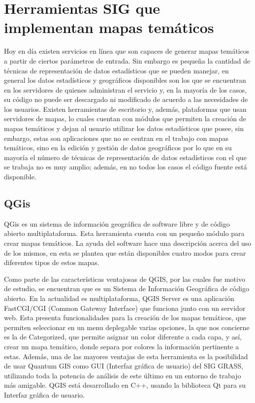 \section{Herramientas SIG que implementan mapas tem\'aticos}
Hoy en d\'ia existen servicios en l\'inea que son capaces de generar mapas tem\'aticos a partir de ciertos par\'ametros de entrada. Sin embargo es peque\~na la cantidad de t\'ecnicas de representaci\'on de datos estad\'isticos que se pueden manejar, en general los datos estad\'isticos y geogr\'aficos disponibles son los que se encuentran en los servidores de quienes administran el servicio y, en la mayor\'ia de los casos, su c\'odigo no puede ser descargado ni modificado de acuerdo a las necesidades de los usuarios. Existen herramientas de escritorio y, adem\'as, plataformas que usan servidores de mapas, lo cuales cuentan con m\'odulos que permiten la creaci\'on de mapas tem\'aticos y dejan al usuario utilizar los datos estad\'isticos que posee, sin embargo, estas son aplicaciones que no se centran en el trabajo con mapas tem\'aticos, sino en la edici\'on y gesti\'on de datos geogr\'aficos por lo que en su mayor\'ia el n\'umero de t\'ecnicas de representaci\'on de datos estad\'isticos con el que se trabaja no es muy amplio; adem\'as, en no todos los casos el c\'odigo fuente est\'a disponible.


\subsection{QGis}
QGis es un sistema de informaci\'on geogr\'afica de software libre y de c\'odigo abierto multiplataforma. Esta herramienta cuenta con un peque\~no m\'odulo para crear mapas tem\'aticos. La ayuda del software hace una descripci\'on acerca del uso de los mismos, en esta se plantea que est\'an disponibles cuatro modos para crear diferentes tipos de estos mapas. 

Como parte de las caracter\'isticas ventajosas de QGIS, por las cuales fue motivo de estudio, se encuentran que es un Sistema de Informaci\'on Geogr\'afica de c\'odigo abierto. En la actualidad es multiplataforma, QGIS Server es una aplicaci\'on FastCGI/CGI (Common Gateway Interface) que funciona junto con un servidor web. Esta presenta funcionalidades para la creaci\'on de los mapas tem\'aticos, que permiten seleccionar en un menu deplegable varias opciones, la que nos concierne es la de Categorized, que permite asignar un color diferente a cada capa, y as\'i, crear un mapa tem\'atico, donde separa por colores la informaci\'on pertinente a estas. Adem\'as, una de las mayores ventajas de esta herramienta es la posibilidad de usar Quantum GIS como GUI (Interfaz gr\'afica de usuario) del SIG GRASS, utilizando toda la potencia de an\'alisis de este \'ultimo en un entorno de trabajo m\'as amigable. QGIS est\'a desarrollado en C++, usando la biblioteca Qt para su Interfaz gr\'afica de usuario. 

